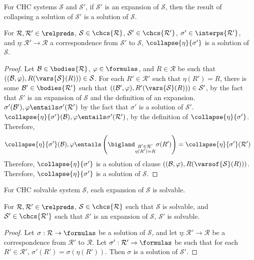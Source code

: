 For CHC systems $\mathcal{S}$ and $\mathcal{S}'$, if $\mathcal{S}'$ is
an expansion of $\mathcal{S}$, then the result of collapsing a
solution of $\mathcal{S}'$ is a solution of $\mathcal{S}$.
%
\begin{lem}
  \label{lem:expansion-sound}
  For $\mathcal{R}, \mathcal{R}' \in \relpreds$, $\mathcal{S} \in
  \chcs{ \mathcal{R} }$, $\mathcal{S}' \in \chcs{ \mathcal{R}' }$,
  $\sigma' \in \interps{ \mathcal{R}' }$, and $\eta : \mathcal{R}' \to
  \mathcal{R}$ a correspondence from $\mathcal{S}'$ to $\mathcal{S}$,
  $\collapse{\eta}{\sigma'}$ is a solution of $\mathcal{S}$.
\end{lem}
%
\begin{proof}
  Let $\mathcal{B} \in \bodies{\mathcal{R}}$, $\varphi \in \formulas$,
  and $R \in \mathcal{R}$ be such that $((\mathcal{B}, \varphi),
  R(\vars{ \mathcal{S} }(R))) \in \mathcal{S}$.
  For each $R' \in \mathcal{R}'$ such that $\eta(R') = R$, there is
  some $\mathcal{B}' \in \bodies{ \mathcal{R}' }$ such that
  $((\mathcal{B}', \varphi), R'(\vars{ \mathcal{S} }(R))) \in
  \mathcal{S}'$, by the fact that $\mathcal{S}'$ is an expansion of
  $\mathcal{S}$ and the definition of an expansion.
  $\sigma'(\mathcal{B}'), \varphi \entails \sigma'(\mathcal{R}')$ by
  the fact that $\sigma'$ is a solution of $\mathcal{S}'$.
  $\collapse{ \eta }{ \sigma' }(\mathcal{B}), \varphi \entails
  \sigma'(\mathcal{R}')$, by the definition of
  $\collapse{\eta}{\sigma'}$.
  Therefore,
  \[ \collapse{ \eta }{ \sigma' }( \mathcal{B} ), \varphi \entails %
  \left( \bigland_{ \substack{R' \in \mathcal{R}' \\ \eta(R') = R} }
  \sigma(R') \right) = %
  \collapse{\eta}{\sigma'}(\mathcal{R}') 
  \]
  Therefore, $\collapse{\eta}{\sigma'}$ is a solution of clause
  $((\mathcal{B}, \varphi), R(\varsof{ \mathcal{S} }(R)))$.
  Therefore, $\collapse{\eta}{\sigma'}$ is a solution of
  $\mathcal{S}$.
\end{proof}

For CHC solvable system $\mathcal{S}$, each expansion of $\mathcal{S}$
is solvable.
\begin{lem}
  \label{lem:expansion-complete}
  For $\mathcal{R}, \mathcal{R}' \in \relpreds$, $\mathcal{S} \in
  \chcs{ \mathcal{R} }$ such that $\mathcal{S}$ is solvable, and
  $\mathcal{S}' \in \chcs{ \mathcal{R}' }$ such that $\mathcal{S'}$ is
  an expansion of $\mathcal{S}$, $\mathcal{S}'$ is solvable.
\end{lem}
%
\begin{proof}
  Let $\sigma : \mathcal{R} \to \formulas$ be a solution of
  $\mathcal{S}$, and let $\eta : \mathcal{R}' \to \mathcal{R}$ be a
  correspondence from $\mathcal{R}'$ to $\mathcal{R}$.
  Let $\sigma' : \mathcal{R}' \to \formulas$ be such that for each $R'
  \in \mathcal{R}'$, $\sigma'(R') = \sigma(\eta(R'))$.
  Then $\sigma$ is a solution of $\mathcal{S}'$.
\end{proof}

